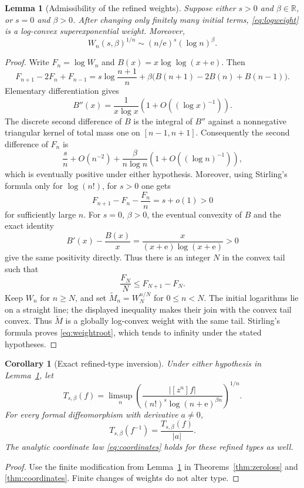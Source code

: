 \documentclass[11pt,a4paper]{article}
\numberwithin{equation}{section}
\newtheorem{lemma}[theorem]{Lemma}
\newtheorem{corollary}[theorem]{Corollary}
\theoremstyle{definition}
\theoremstyle{remark}
\newcommand{\R}{\mathbb R}
\newcommand{\ee}{\mathrm e}
\begin{document}
\begin{lemma}[Admissibility of the refined weights]
\label{lem:refinedweight}
Suppose either $s>0$ and $\beta\in\R$, or $s=0$ and $\beta>0$.
After changing only finitely many initial terms, \eqref{eq:logweight}
is a log-convex superexponential weight. Moreover,
\begin{equation}
 W_n(s,\beta)^{1/n}\sim(n/\ee)^s(\log n)^\beta.
 \label{eq:weightroot}
\end{equation}
\end{lemma}
\begin{proof}
Write $F_n=\log W_n$ and $B(x)=x\log\log(x+\ee)$. Then
\[
 F_{n+1}-2F_n+F_{n-1}
 =s\log\frac{n+1}{n}+\beta\bigl(B(n+1)-2B(n)+B(n-1)\bigr).
\]
Elementary differentiation gives
\[
 B''(x)=\frac1{x\log x}\left(1+O((\log x)^{-1})\right).
\]
The discrete second difference of $B$ is the integral of $B''$ against
a nonnegative triangular kernel of total mass one on $[n-1,n+1]$.
Consequently the second difference of $F_n$ is
\[
 \frac{s}{n}+O(n^{-2})+
 \frac{\beta}{n\log n}\left(1+O((\log n)^{-1})\right),
\]
which is eventually positive under either hypothesis. Moreover, using
Stirling's formula only for $\log(n!)$, for $s>0$ one gets
\[
 F_{n+1}-F_n-\frac{F_n}{n}=s+o(1)>0
\]
for sufficiently large $n$. For $s=0$, $\beta>0$, the eventual
convexity of $B$ and the exact identity
\[
 B'(x)-\frac{B(x)}x=\frac{x}{(x+\ee)\log(x+\ee)}>0
\]
give the same positivity directly. Thus there is an integer $N$ in
the convex tail such that
\[
 \frac{F_N}{N}\le F_{N+1}-F_N.
\]
Keep $W_n$ for $n\ge N$, and set $\widetilde M_n=W_N^{n/N}$ for
$0\le n<N$. The initial logarithms lie on a straight line; the displayed
inequality makes their join with the convex tail convex. Thus
$\widetilde M$ is a globally log-convex weight with the same tail.
Stirling's formula proves \eqref{eq:weightroot}, which tends to infinity
under the stated hypotheses.
\end{proof}

\begin{corollary}[Exact refined-type inversion]
\label{cor:refinedgeneral}
Under either hypothesis in Lemma~\ref{lem:refinedweight}, let
\[
 T_{s,\beta}(f)=\limsup_n
 \left(\frac{|[z^n]f|}{(n!)^s\log(n+\ee)^{\beta n}}\right)^{1/n}.
\]
For every formal diffeomorphism with derivative $a\ne0$,
\begin{equation}
 T_{s,\beta}(f^{-1})=\frac{T_{s,\beta}(f)}{|a|}.
 \label{eq:refinedgeneral}
\end{equation}
The analytic coordinate law \eqref{eq:coordinates} holds for these
refined types as well.
\end{corollary}
\begin{proof}
Use the finite modification from Lemma~\ref{lem:refinedweight} in
Theorems~\ref{thm:zeroloss} and \ref{thm:coordinates}. Finite changes
of weights do not alter type.
\end{proof}
\end{document}
